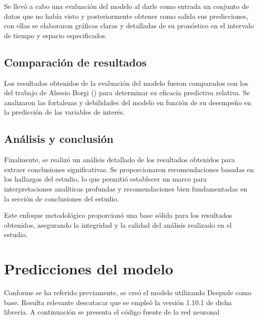 \documentclass[
  spanish,
  us-letterpaper,
  DIV=11,
  numbers=noendperiod]{scrreprt}
\begin{document}
Se llevó a cabo una evaluación del modelo al darle como entrada un
conjunto de datos que no había visto y posteriormente obtener como
salida sus predicciones, con ellas se elaboraron gráficas claras y
detalladas de su pronóstico en el intervalo de tiempo y espacio
especificados.

\section{Comparación de resultados}\label{comparaciuxf3n-de-resultados}

Los resultados obtenidos de la evaluación del modelo fueron comparados
con los del trabajo de Alessio Borgi ()
para determinar su eficacia predictiva relativa. Se analizaron las
fortalezas y debilidades del modelo en función de su desempeño en la
predicción de las variables de interés.

\section{Análisis y conclusión}\label{anuxe1lisis-y-conclusiuxf3n}

Finalmente, se realizó un análisis detallado de los resultados obtenidos
para extraer conclusiones significativas. Se proporcionaron
recomendaciones basadas en los hallazgos del estudio, lo que permitió
establecer un marco para interpretaciones analíticas profundas y
recomendaciones bien fundamentadas en la sección de conclusiones del
estudio.

Este enfoque metodológico proporcionó una base sólida para los
resultados obtenidos, asegurando la integridad y la calidad del análisis
realizado en el estudio.

\chapter{Predicciones del modelo}\label{predicciones-del-modelo}

Conforme se ha referido previamente, se creó el modelo utilizando
Deepxde como base. Resulta relevante descatacar que se empleó la versión
1.10.1 de dicha librería. A continuación se presenta el código fuente de
la red neuronal
\end{document}
